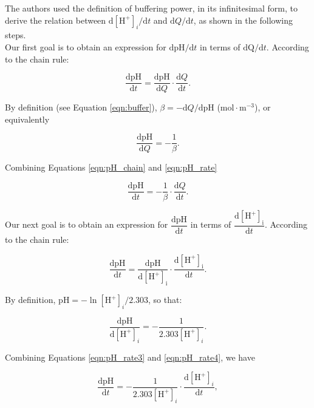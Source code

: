 \documentclass[fleqn,10pt]{physiome}
\begin{document}
The authors used the definition of buffering power, in its infinitesimal form, to derive the relation between \(\mathrm{d}{[\mathrm{H^+}]_i}/\mathrm{d}t\) and \(\mathrm{d}Q/\mathrm{d}t\), as shown in the following steps.\\

Our first goal is to obtain an expression for \(\mathrm{d}{\mathrm{pH}}/\mathrm{d}t\) in terms of \(\mathrm{d}{\mathrm{Q}}/\mathrm{d}t\). According to the chain rule:

\begin{equation}
\dfrac{\mathrm{dpH}}{\mathrm{d}t}=\dfrac{\mathrm{dpH}}{\mathrm{d}Q} \cdot \dfrac{\mathrm{d}Q}{\mathrm{d}t}.
\label{eqn:pH_chain}
\end{equation}

By definition (see Equation \ref{eqn:buffer}), \(\beta=-{\mathrm{d}Q}/{\mathrm{dpH}}\) ($\mathrm{mol\cdot m^{-3}}$), or equivalently

\begin{equation}
\dfrac{\mathrm{dpH}}{\mathrm{d}Q}=-\dfrac{1}{\beta}.
\label{eqn:pH_rate}
\end{equation}

Combining Equations \ref{eqn:pH_chain} and \ref{eqn:pH_rate}

\begin{equation}
\dfrac{\mathrm{dpH}}{\mathrm{d}t}=-\dfrac{1}{\beta}\cdot \dfrac{\mathrm{d}Q}{\mathrm{d}t}.
\label{eqn:pH_rate2}
\end{equation}

Our next goal is to obtain an expression for $\dfrac{\mathrm{dpH}}{\mathrm{d}t}$ in terms of $\dfrac{\mathrm{d[H^+]_i}}{\mathrm{d}t}$. According to the chain rule:

\begin{equation}
\dfrac{\mathrm{dpH}}{\mathrm{d}t}=\dfrac{\mathrm{dpH}}{\mathrm{d[H^+]_i}}\cdot \dfrac{\mathrm{d[H^+]_i}}{\mathrm{d}t}.
\label{eqn:pH_rate3}
\end{equation}

By definition, \(\mathrm{pH}={-\ln{[\mathrm{H^+}]_i}}/{2.303}\), so that:

\begin{equation}
\dfrac{\mathrm{dpH}}{\mathrm{d}{[\mathrm{H^+}]_i}}=-\dfrac{1}{2.303\mathrm{[H^+]}_i}.
\label{eqn:pH_rate4}
\end{equation}

Combining Equations \ref{eqn:pH_rate3} and \ref{eqn:pH_rate4}, we have

\begin{equation}
\dfrac{\mathrm{dpH}}{\mathrm{d}t}=-\dfrac{1}{2.303\mathrm{[H^+]}_i}\cdot\dfrac{\mathrm{d}\mathrm{[H^+]}_i}{\mathrm{d}t},
\end{equation}
\end{document}
